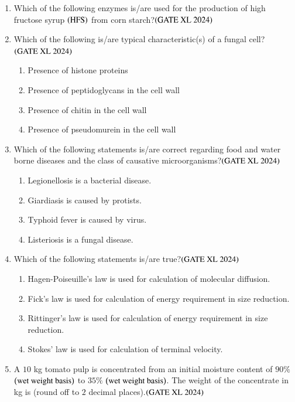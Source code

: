 \documentclass[journal]{IEEEtran}
\begin{document}
\begin{enumerate}
    \item Which of the following enzymes is/are used for the production of high fructose syrup $\left(\text{HFS}\right)$ from corn starch?\hfill $\left(\text{GATE XL 2024}\right)$
    \begin{enumerate}
    \end{enumerate}

    \item Which of the following is/are typical characteristic(s) of a fungal cell?\hfill $\left(\text{GATE XL 2024}\right)$
    \begin{enumerate}
        \item Presence of histone proteins
        \item Presence of peptidoglycans in the cell wall
        \item Presence of chitin in the cell wall
        \item Presence of pseudomurein in the cell wall
    \end{enumerate}

    \item Which of the following statements is/are correct regarding food and water borne diseases and the class of causative microorganisms?\hfill $\left(\text{GATE XL 2024}\right)$
    \begin{enumerate}
        \item Legionellosis is a bacterial disease.
        \item Giardiasis is caused by protists.
        \item Typhoid fever is caused by virus.
        \item Listeriosis is a fungal disease.
    \end{enumerate}

    \item Which of the following statements is/are true?\hfill $\left(\text{GATE XL 2024}\right)$
    \begin{enumerate}
        \item Hagen-Poiseuille's law is used for calculation of molecular diffusion.
        \item Fick's law is used for calculation of energy requirement in size reduction.
        \item Rittinger's law is used for calculation of energy requirement in size reduction.
        \item Stokes' law is used for calculation of terminal velocity.
    \end{enumerate}

    \item A $10$ kg tomato pulp is concentrated from an initial moisture content of $90\%$ $\left(\text{wet weight basis}\right)$ to $35\%$ $\left(\text{wet weight basis}\right)$. The weight of the concentrate in kg is (round off to $2$ decimal places).\hfill $\left(\text{GATE XL 2024}\right)$
\end{enumerate}
\end{document}
